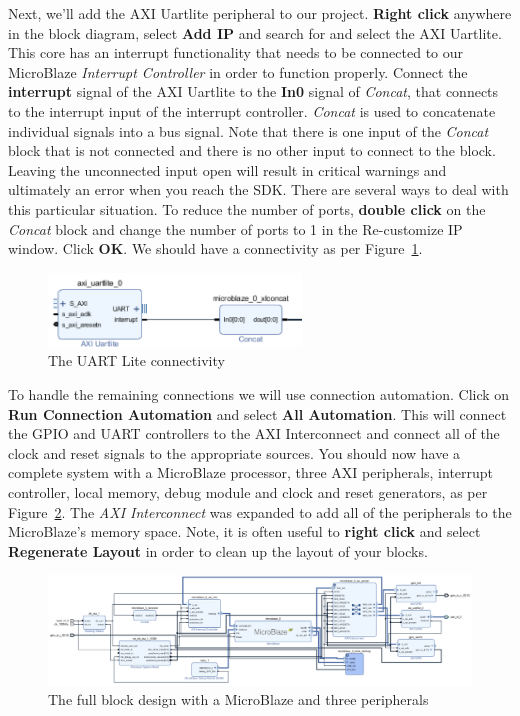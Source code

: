 \documentclass[11pt]{article}
\begin{document}
Next, we'll add the AXI Uartlite peripheral to our project. \textbf{Right click} anywhere in the block diagram, select \textbf{Add IP} and search for and select the AXI Uartlite. This core has an interrupt functionality that needs to be connected to our MicroBlaze \textit{Interrupt Controller} in order to function properly. Connect the \textbf{interrupt} signal of the AXI Uartlite to the \textbf{In0} signal of \textit{Concat}, that connects to the interrupt input of the interrupt controller. \textit{Concat} is used to concatenate individual signals into a bus signal. Note that there is one input of the \textit{Concat} block that is not connected and there is no other input to connect to the block. Leaving the unconnected input open will result in critical warnings and ultimately an error when you reach the SDK. There are several ways to deal with this particular situation. To reduce the number of ports, \textbf{double click} on the \textit{Concat} block and
change the number of ports to 1 in the Re-customize IP window. Click \textbf{OK}. We should have a connectivity as per Figure~\ref{fig:uart_connect}.

\begin{figure}[h]
    \centering
    \includegraphics[width=0.6\textwidth]{images/uart_connect.png}
    \caption{The UART Lite connectivity}
    \label{fig:uart_connect}
\end{figure}

To handle the remaining connections we will use connection automation. Click on \textbf{Run Connection Automation} and select
\textbf{All Automation}. This will connect the GPIO and UART controllers to the AXI Interconnect and connect all of the clock and reset signals to the appropriate sources. You should now have a complete system with a MicroBlaze processor, three AXI peripherals, interrupt controller, local memory, debug module and clock and reset generators, as per Figure~\ref{fig:block_design_full}. The \textit{AXI Interconnect} was expanded to add all of the peripherals to the MicroBlaze's memory space. Note, it is often useful to \textbf{right click} and select \textbf{Regenerate Layout} in order to clean up the layout of your blocks.

\begin{figure}[h]
    \centering
    \includegraphics[width=\textwidth]{images/block_design_full.png}
    \caption{The full block design with a MicroBlaze and three peripherals}
    \label{fig:block_design_full}
\end{figure}
\end{document}
